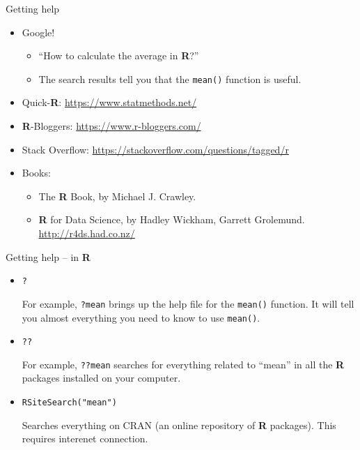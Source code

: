 \documentclass[ignorenonframetext,]{beamer}
\providecommand{\tightlist}{%
  \setlength{\itemsep}{0pt}\setlength{\parskip}{0pt}}
\begin{document}
\begin{frame}[fragile]{Getting help}

\begin{itemize}
\item
  Google!

  \begin{itemize}
  \tightlist
  \item
    ``How to calculate the average in \textbf{R}?''
  \item
    The search results tell you that the \texttt{mean()} function is
    useful.
  \end{itemize}
\item
  Quick-\textbf{R}: \url{https://www.statmethods.net/}
\item
  \textbf{R}-Bloggers: \url{https://www.r-bloggers.com/}
\item
  Stack Overflow: \url{https://stackoverflow.com/questions/tagged/r}
\item
  Books:

  \begin{itemize}
  \tightlist
  \item
    The \textbf{R} Book, by Michael J. Crawley.
  \item
    \textbf{R} for Data Science, by Hadley Wickham, Garrett Grolemund.
    \url{http://r4ds.had.co.nz/}
  \end{itemize}
\end{itemize}

\end{frame}

\begin{frame}[fragile]{Getting help -- in \textbf{R}}

\begin{itemize}
\item
  \texttt{?}

  For example, \texttt{?mean} brings up the help file for the
  \texttt{mean()} function. It will tell you almost everything you need
  to know to use \texttt{mean()}.
\item
  \texttt{??}

  For example, \texttt{??mean} searches for everything related to
  ``mean'' in all the \textbf{R} packages installed on your computer.
\item
  \texttt{RSiteSearch("mean")}

  Searches everything on CRAN (an online repository of \textbf{R}
  packages). This requires interenet connection.
\end{itemize}

\end{frame}
\end{document}
